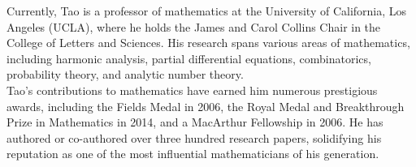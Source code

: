 Currently, Tao is a professor of mathematics at the University of California, Los Angeles (UCLA), where he holds the James and Carol Collins Chair in the College of Letters and Sciences. His research spans various areas of mathematics, including harmonic analysis, partial differential equations, combinatorics, probability theory, and analytic number theory.\\

Tao's contributions to mathematics have earned him numerous prestigious awards, including the Fields Medal in 2006, the Royal Medal and Breakthrough Prize in Mathematics in 2014, and a MacArthur Fellowship in 2006. He has authored or co-authored over three hundred research papers, solidifying his reputation as one of the most influential mathematicians of his generation.\\











